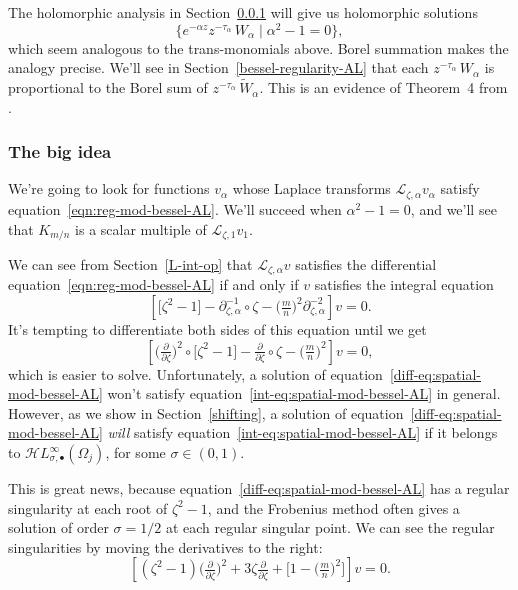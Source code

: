 \documentclass{article}
\newcommand{\singexp}[2]{\mathcal{H}L^\infty_{#1, #2}}
\newcommand{\singexpalg}[1]{\singexp{#1}{\bullet}}
\theoremstyle{definition}
\newcommand{\series}[1]{\tilde{#1}}
\newcommand{\fracderiv}[3]{\partial^{#1}_{#2, #3}}
\newcommand{\laplace}{\mathcal{L}}
\begin{document}
The holomorphic analysis in Section~\ref{big-idea} will give us holomorphic solutions
\[ \{ e^{-\alpha z} z^{-\tau_\alpha}\,W_\alpha \mid \alpha^2 - 1 = 0 \}, \]
which seem analogous to the trans-monomials above. Borel summation makes the analogy precise. We’ll see in Section~\ref{bessel-regularity-AL} that each $z^{-\tau_\alpha}\,W_\alpha$ is proportional to the Borel sum of $z^{-\tau_\alpha}\,\series{W}_\alpha$. This is an evidence of Theorem~4 from \cite{reg-sing-volterra}.
\subsubsection{The big idea}\label{big-idea}
We're going to look for functions $v_\alpha$ whose Laplace transforms $\laplace_{\zeta, \alpha} v_\alpha$ satisfy equation~\eqref{eqn:reg-mod-bessel-AL}. We'll succeed when $\alpha^2 - 1 = 0$, and we'll see that $K_{m/n}$ is a scalar multiple of $\laplace_{\zeta, 1} v_1$.

We can see from Section~\ref{L-int-op} that $\laplace_{\zeta, \alpha} v$ satisfies the differential equation~\eqref{eqn:reg-mod-bessel-AL} if and only if $v$ satisfies the integral equation
\begin{equation}\label{int-eq:spatial-mod-bessel-AL}
\left[ \big[ \zeta^2 - 1 \big] - \fracderiv{-1}{\zeta}{\alpha} \circ \zeta - \big(\tfrac{m}{n}\big)^2 \fracderiv{-2}{\zeta}{\alpha} \right] v = 0.
\end{equation}
It's tempting to differentiate both sides of this equation until we get
\begin{equation}\label{diff-eq:spatial-mod-bessel-AL}
\left[ \big(\tfrac{\partial}{\partial \zeta}\big)^2 \circ \big[ \zeta^2 - 1 \big] - \tfrac{\partial}{\partial \zeta} \circ \zeta - \big(\tfrac{m}{n}\big)^2 \right] v = 0,
\end{equation}
which is easier to solve. Unfortunately, a solution of equation~\eqref{diff-eq:spatial-mod-bessel-AL} won't satisfy equation~\eqref{int-eq:spatial-mod-bessel-AL} in general. However, as we show in Section~\ref{shifting}, a solution of equation~\eqref{diff-eq:spatial-mod-bessel-AL} {\em will} satisfy equation~\eqref{int-eq:spatial-mod-bessel-AL} if it belongs to $\singexpalg{\sigma}(\Omega_j)$, for some $\sigma\in (0,1)$.

This is great news, because equation~\eqref{diff-eq:spatial-mod-bessel-AL} has a regular singularity at each root of $\zeta^2 - 1$, and the Frobenius method often gives a solution of order $\sigma=1/2$ at each regular singular point. We can see the regular singularities by moving the derivatives to the right:
\[ \left[ (\zeta^2 - 1) \big(\tfrac{\partial}{\partial \zeta}\big)^2 + 3\zeta \tfrac{\partial}{\partial \zeta} + \big[ 1 - \big(\tfrac{m}{n}\big)^2 \big] \right] v = 0. \]
\end{document}
